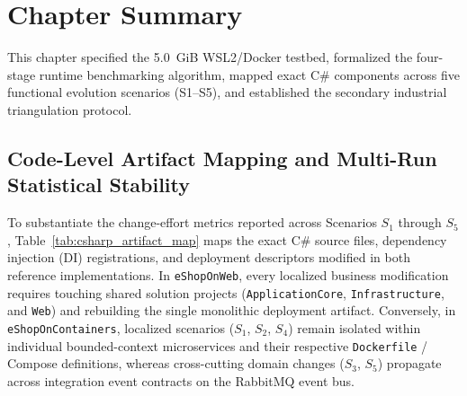 \section{Chapter Summary}
\label{sec:ch3-summary}
This chapter specified the 5.0~GiB WSL2/Docker testbed, formalized the four-stage runtime benchmarking algorithm, mapped exact C\# components across five functional evolution scenarios (S1--S5), and established the secondary industrial triangulation protocol.

\subsection{Code-Level Artifact Mapping and Multi-Run Statistical Stability}

To substantiate the change-effort metrics reported across Scenarios $S_1$ through $S_5$, Table~\ref{tab:csharp_artifact_map} maps the exact C\# source files, dependency injection (DI) registrations, and deployment descriptors modified in both reference implementations. In \texttt{eShopOnWeb}, every localized business modification requires touching shared solution projects (\texttt{ApplicationCore}, \texttt{Infrastructure}, and \texttt{Web}) and rebuilding the single monolithic deployment artifact. Conversely, in \texttt{eShopOnContainers}, localized scenarios ($S_1$, $S_2$, $S_4$) remain isolated within individual bounded-context microservices and their respective \texttt{Dockerfile} / Compose definitions, whereas cross-cutting domain changes ($S_3$, $S_5$) propagate across integration event contracts on the RabbitMQ event bus.

